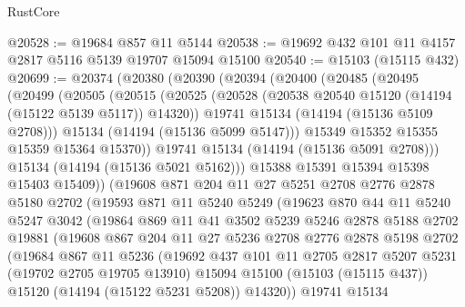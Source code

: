 \begin{lexlean}{RustCore}
\begin{coremodule}
@20528 := @19684 @857 @11 @5144
@20538 := @19692 @432 @101 @11 @4157 @2817 @5116 @5139 @19707 @15094 @15100
@20540 := @15103 (@15115 @432)
@20699 := @20374
    (@20380
      (@20390
        (@20394
          (@20400
            (@20485
              (@20495
                (@20499
                  (@20505
                    (@20515
                      (@20525
                        (@20528 (@20538 @20540 @15120 (@14194 (@15122 @5139 @5117)) @14320))
                        @19741
                        @15134
                        (@14194 (@15136 @5109 @2708)))
                      @15134
                      (@14194 (@15136 @5099 @5147)))
                    @15349
                    @15352
                    @15355
                    @15359
                    @15364
                    @15370))
                @19741
                @15134
                (@14194 (@15136 @5091 @2708)))
              @15134
              (@14194 (@15136 @5021 @5162)))
            @15388
            @15391
            @15394
            @15398
            @15403
            @15409))
        (@19608
          @871
          @204
          @11
          @27
          @5251
          @2708
          @2776
          @2878
          @5180
          @2702
          (@19593
            @871
            @11
            @5240
            @5249
            (@19623
              @870
              @44
              @11
              @5240
              @5247
              @3042
              (@19864
                @869
                @11
                @41
                @3502
                @5239
                @5246
                @2878
                @5188
                @2702
                @19881
                (@19608
                  @867
                  @204
                  @11
                  @27
                  @5236
                  @2708
                  @2776
                  @2878
                  @5198
                  @2702
                  (@19684
                    @867
                    @11
                    @5236
                    (@19692
                      @437
                      @101
                      @11
                      @2705
                      @2817
                      @5207
                      @5231
                      (@19702 @2705 @19705 @13910)
                      @15094
                      @15100
                      (@15103 (@15115 @437))
                      @15120
                      (@14194 (@15122 @5231 @5208))
                      @14320))
                  @19741
                  @15134

\end{coremodule}
\end{lexlean}
